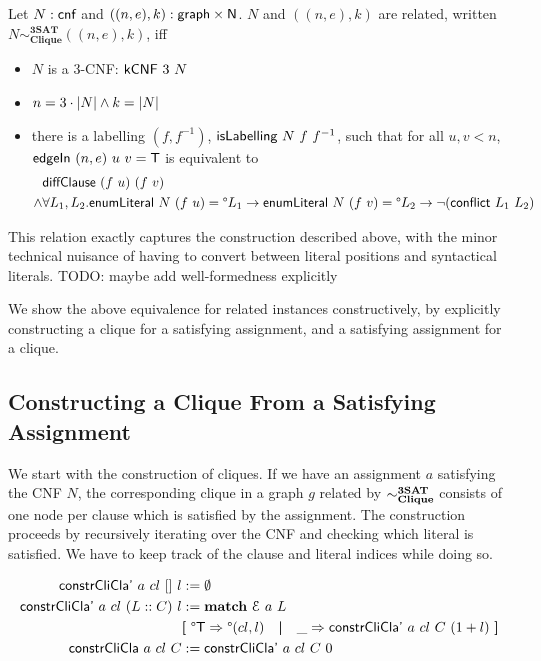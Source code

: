\documentclass[a4paper,UKenglish,cleveref, autoref]{lipics-v2019}
\begin{document}
\begin{definition}
  Let $N : \textsf{cnf}$ and $((n, e), k) : \textsf{graph} \times \mathsf{N}$. $N$ and $((n, e), k)$ are related, written $N \sim^{\textbf{3SAT}}_{\textbf{Clique}} ((n, e), k)$, iff 
  \begin{itemize} 
    \item $N$ is a 3-CNF: $\normalfont\textsf{kCNF}~3~N$
    \item $n = 3 \cdot |N| \land k = |N|$
    \item there is a labelling $(f, f^{-1})$, $\normalfont\textsf{isLabelling}~N~f~f^{-1}$, such that for all $u, v < n$, $\normalfont\textsf{edgeIn}~(n, e)~u~v = \mathsf{T}$ is equivalent to
      \begin{align*}
        &\normalfont\textsf{diffClause}~(f~u)~(f~v) \\
      \land& \forall L_1,L_2. \normalfont{\textsf{enumLiteral}}~N~(f~u) = \degree L_1 \rightarrow \normalfont{\textsf{enumLiteral}}~N~(f~v) = \degree L_2 \rightarrow \lnot (\normalfont\textsf{conflict}~L_1~L_2) 
    \end{align*}
  \end{itemize}
\end{definition}

This relation exactly captures the construction described above, with the minor technical nuisance of having to convert between literal positions and syntactical literals.
TODO: maybe add well-formedness explicitly

We show the above equivalence for related instances constructively, by explicitly constructing a clique for a satisfying assignment, and a satisfying assignment for a clique. 

\subsection{Constructing a Clique From a Satisfying Assignment}
We start with the construction of cliques. If we have an assignment $a$ satisfying the CNF $N$, the corresponding clique in a graph $g$ related by $\sim^{\textbf{3SAT}}_{\textbf{Clique}}$ consists of one node per clause which is satisfied by the assignment. The construction proceeds by recursively iterating over the CNF and checking which literal is satisfied. We have to keep track of the clause and literal indices while doing so.

\begin{align*}
  \textsf{constrCliCla'}~a~cl~[]~l &:= \emptyset \\
  \textsf{constrCliCla'}~a~cl~(L::C)~l &:= \textbf{match}~ \mathcal{E}~a~L~ \\
  &\textbf{[}~ \degree\mathsf{T} \Rightarrow \degree(cl, l) \quad\textbf{|}\quad \_ \Rightarrow \textsf{constrCliCla'}~a~cl~C~(1 +{l}) ~\textbf{]}\\
  \textsf{constrCliCla}~a~cl~C &:= \textsf{constrCliCla'}~a~cl~C~0
\end{align*}
\end{document}
